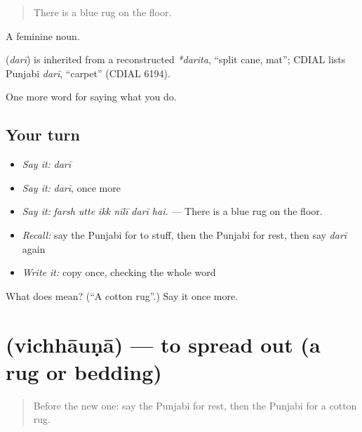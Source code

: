 \begin{quote}
There is a blue rug on the floor.
\end{quote}

A feminine noun.

\begin{cousinweb}
\textbf{} (\emph{darī}) is inherited from a reconstructed \emph{*darita}, \textquotedblleft{}split cane, mat\textquotedblright{}; CDIAL lists Punjabi \emph{darī}, \textquotedblleft{}carpet\textquotedblright{} (CDIAL 6194).
\end{cousinweb}

\begin{grammarlens}[title={What you've built}]
One more word for saying what you do.
\end{grammarlens}

\subsection*{Your turn}
\begin{itemize}
\raggedright
  \item \emph{Say it:} \emph{darī}
  \item \emph{Say it:} \emph{darī}, once more
  \item \emph{Say it:} \emph{farsh utte ikk nīlī darī hai.} — There is a blue rug on the floor.
  \item \emph{Recall:} say the Punjabi for to stuff, then the Punjabi for rest, then say \emph{darī} again
  \item \emph{Write it:} copy \textbf{} once, checking the whole word
\end{itemize}

\begin{tcolorbox}[breakable,colback=teal!4,colframe=teal!35!black,title={Before you move on}]
What does  mean? (\textquotedblleft{}A cotton rug\textquotedblright{}.) Say it once more.
\end{tcolorbox}
\section[\texorpdfstring{\pa{ਵਿਛਾਉਣਾ} (vichhāuṇā)}{ਵਿਛਾਉਣਾ (vichhāuṇā)}]{ (vichhāuṇā) — to spread out (a rug or bedding)}

\label{lesson:PA-C233-vichhauna}



\begin{quote}
Before the new one: say the Punjabi for rest, then the Punjabi for a cotton rug.
\end{quote}

